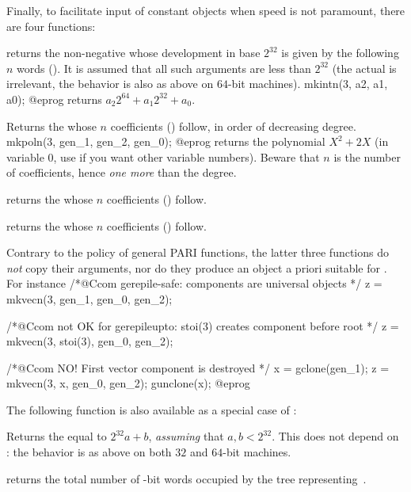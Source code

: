 Finally, to facilitate input of constant objects when speed is not paramount,
there are four  functions:

returns the non-negative  whose development in base $2^{32}$
is given by the following $n$ words (). It is assumed that
all such arguments are less than $2^{32}$ (the actual  is
irrelevant, the behavior is also as above on $64$-bit machines).
\bprog
  mkintn(3, a2, a1, a0);
@eprog
\noindent returns $a_2 2^{64} + a_1 2^{32} + a_0$.

Returns the  whose $n$ coefficients () follow, in order of
decreasing degree.
\bprog
  mkpoln(3, gen_1, gen_2, gen_0);
@eprog
\noindent returns the polynomial $X^2 + 2X$ (in variable $0$, use
 if you want other variable numbers). Beware that $n$ is the
number of coefficients, hence \emph{one more} than the degree.

returns the  whose $n$ coefficients () follow.

returns the  whose $n$ coefficients () follow.

 Contrary to the policy of general PARI functions, the
latter three functions do \emph{not} copy their arguments, nor do they produce
an object a priori suitable for . For instance
\bprog
  /*@Ccom gerepile-safe: components are universal objects */
  z = mkvecn(3, gen_1, gen_0, gen_2);

  /*@Ccom not OK for gerepileupto: stoi(3) creates component before root */
  z = mkvecn(3, stoi(3), gen_0, gen_2);

  /*@Ccom NO! First vector component  is destroyed */
  x = gclone(gen_1);
  z = mkvecn(3, x, gen_0, gen_2);
  gunclone(x);
@eprog

\noindent The following function is also available as a special case of
:


Returns the  equal to $2^{32} a + b$, \emph{assuming} that
$a,b < 2^{32}$. This does not depend on : the behavior is
as above on both $32$ and $64$-bit machines.


 returns the total number of \B-bit words occupied
by the tree representing~.

